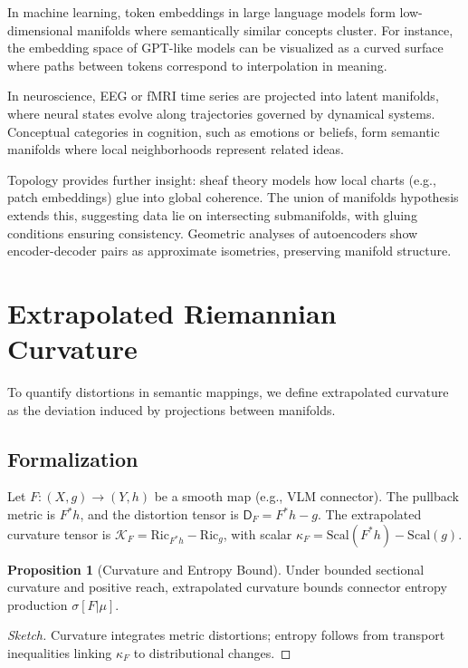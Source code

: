 \documentclass{article}
\theoremstyle{definition}
\newtheorem{proposition}[theorem]{Proposition}
\begin{document}
In machine learning, token embeddings in large language models form low-dimensional manifolds where semantically similar concepts cluster. For instance, the embedding space of GPT-like models can be visualized as a curved surface where paths between tokens correspond to interpolation in meaning.

In neuroscience, EEG or fMRI time series are projected into latent manifolds, where neural states evolve along trajectories governed by dynamical systems. Conceptual categories in cognition, such as emotions or beliefs, form semantic manifolds where local neighborhoods represent related ideas.

Topology provides further insight: sheaf theory models how local charts (e.g., patch embeddings) glue into global coherence. The union of manifolds hypothesis \citep{brown2023union} extends this, suggesting data lie on intersecting submanifolds, with gluing conditions ensuring consistency. Geometric analyses of autoencoders \citep{lee2023geometric} show encoder-decoder pairs as approximate isometries, preserving manifold structure.

\section{Extrapolated Riemannian Curvature}

To quantify distortions in semantic mappings, we define extrapolated curvature as the deviation induced by projections between manifolds.

\subsection{Formalization}

Let $F: (X, g) \to (Y, h)$ be a smooth map (e.g., VLM connector). The pullback metric is $F^* h$, and the distortion tensor is $\mathsf{D}_F = F^* h - g$. The extrapolated curvature tensor is $\mathcal{K}_F = \mathrm{Ric}_{F^* h} - \mathrm{Ric}_g$, with scalar $\kappa_F = \mathrm{Scal}(F^* h) - \mathrm{Scal}(g)$.

\begin{proposition}[Curvature and Entropy Bound]
Under bounded sectional curvature and positive reach, extrapolated curvature bounds connector entropy production $\sigma[F|\mu]$.
\end{proposition}

\begin{proof}[Sketch]
Curvature integrates metric distortions; entropy follows from transport inequalities linking $\kappa_F$ to distributional changes.
\end{proof}
\end{document}
